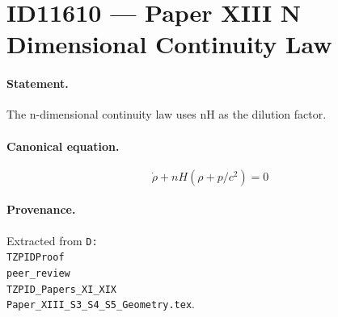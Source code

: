 \section*{ID11610 --- Paper XIII N Dimensional Continuity Law}

\paragraph{Statement.}
The n-dimensional continuity law uses nH as the dilution factor.

\paragraph{Canonical equation.}
\[
\dot\rho+nH(\rho+p/c^2)=0
\]

\paragraph{Provenance.}
Extracted from \texttt{D:\\TZPIDProof\\peer\_review\\TZPID\_Papers\_XI\_XIX\\Paper\_XIII\_S3\_S4\_S5\_Geometry.tex}.
